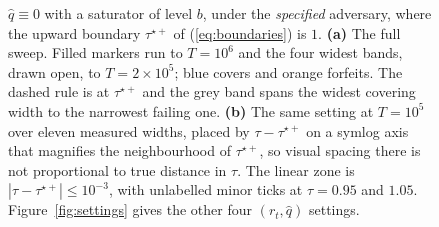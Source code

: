 \begin{figure}[!ht]
{  $\hat{q} \equiv 0$ with a saturator of level $b$, under the \emph{specified} adversary, where
  the upward boundary $\tau^{\star+}$ of (\ref{eq:boundaries}) is $1$. \textbf{(a)} The full
  sweep. Filled markers run to $T = 10^{6}$ and the four widest bands, drawn open, to $T =
  2{\times}10^{5}$; blue covers and orange forfeits. The dashed rule is at $\tau^{\star+}$ and the
  grey band spans the widest covering width to the narrowest failing one.
  \textbf{(b)} The same setting at $T = 10^{5}$ over eleven measured widths, placed by $\tau -
  \tau^{\star+}$ on a symlog axis that magnifies the neighbourhood of $\tau^{\star+}$, so visual
  spacing there is not proportional to true distance in $\tau$. The linear zone is $|\tau -
  \tau^{\star+}| \le 10^{-3}$, with unlabelled minor ticks at $\tau = 0.95$ and $1.05$. Figure~\ref{fig:settings}
  gives the other four $(r_t,\hat{q})$ settings.}
  \label{fig:boundary}
\end{figure}

